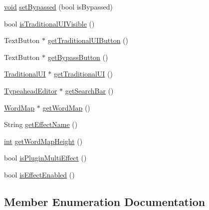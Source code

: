 \begin{DoxyCompactItemize}
\item 
\hyperlink{tk_8h_aba408b7cd755a96426e004c015f5de8e}{void} \hyperlink{class_audealize_1_1_audealize_u_i_a975132dcdae4462a1fd700864c8fda9e}{set\+Bypassed} (bool is\+Bypassed)
\item 
bool \hyperlink{class_audealize_1_1_audealize_u_i_aeca6fb4ba3fc507cbc655cbea3495e8a}{is\+Traditional\+U\+I\+Visible} ()
\item 
Text\+Button $\ast$ \hyperlink{class_audealize_1_1_audealize_u_i_a1b6c043013abf9ece8e7134e913c4d63}{get\+Traditional\+U\+I\+Button} ()
\item 
Text\+Button $\ast$ \hyperlink{class_audealize_1_1_audealize_u_i_aa7b47494a406382edfffdb2c79263f43}{get\+Bypass\+Button} ()
\item 
\hyperlink{class_audealize_1_1_traditional_u_i}{Traditional\+UI} $\ast$ \hyperlink{class_audealize_1_1_audealize_u_i_a3aacc48123b4709bb0349fdfc75ae9ff}{get\+Traditional\+UI} ()
\item 
\hyperlink{class_typeahead_editor}{Typeahead\+Editor} $\ast$ \hyperlink{class_audealize_1_1_audealize_u_i_a5dc6ab0b86b64964fd30d470c360c74f}{get\+Search\+Bar} ()
\item 
\hyperlink{class_audealize_1_1_word_map}{Word\+Map} $\ast$ \hyperlink{class_audealize_1_1_audealize_u_i_affc13f7dc31cb1544b4e73fa7c8faa07}{get\+Word\+Map} ()
\item 
String \hyperlink{class_audealize_1_1_audealize_u_i_a2ba5a78e8ea3e16f6a925015f76495a3}{get\+Effect\+Name} ()
\item 
\hyperlink{tk_8h_a83f82f76e7fed06f4c49d2db94028a6d}{int} \hyperlink{class_audealize_1_1_audealize_u_i_abac99c4e9398e756b332e3c2893c45c2}{get\+Word\+Map\+Height} ()
\item 
bool \hyperlink{class_audealize_1_1_audealize_u_i_ac5cfa0dc74706b4df821f7addfcc108d}{is\+Plugin\+Multi\+Effect} ()
\item 
bool \hyperlink{class_audealize_1_1_audealize_u_i_a5e547f20b6675dface86ee0e3c92f174}{is\+Effect\+Enabled} ()
\end{DoxyCompactItemize}


\subsection{Member Enumeration Documentation}
